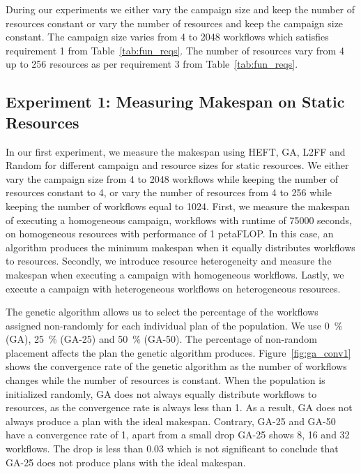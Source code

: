 During our experiments we either vary the campaign size and keep the number of resources constant or vary the number of resources and keep the campaign size constant.
The campaign size varies from 4 to 2048 workflows which satisfies requirement 1 from Table~\ref{tab:fun_reqs}.
The number of resources vary from 4 up to 256 resources as per requirement 3 from Table~\ref{tab:fun_reqs}.


\subsection{Experiment 1: Measuring Makespan on Static Resources}

In our first experiment, we measure the makespan using HEFT, GA, L2FF and Random for different campaign and resource sizes for static resources.
We either vary the campaign size from 4 to 2048 workflows while keeping the number of resources constant to 4, or vary the number of resources from 4 to 256 while keeping the number of workflows equal to 1024.
First, we measure the makespan of executing a homogeneous campaign, workflows with runtime of 75000 seconds, on homogeneous resources with performance of 1 petaFLOP.
In this case, an algorithm produces the minimum makespan when it equally distributes workflows to resources.
Secondly, we introduce resource heterogeneity and measure the makespan when executing a campaign with homogeneous workflows.
Lastly, we execute a campaign with heterogeneous workflows on heterogeneous resources.

The genetic algorithm allows us to select the percentage of the workflows assigned non-randomly for each individual plan of the population.
We use 0~\% (GA), 25~\% (GA-25) and 50~\% (GA-50).
The percentage of non-random placement affects the plan the genetic algorithm produces.
Figure~\ref{fig:ga_conv1} shows the convergence rate of the genetic algorithm as the number of workflows changes while the number of resources is constant.
When the population is initialized randomly, GA does not always equally distribute workflows to resources, as the convergence rate is always less than 1.
As a result, GA does not always produce a plan with the ideal makespan.
Contrary, GA-25 and GA-50 have a convergence rate of 1, apart from a small drop GA-25 shows 8, 16 and 32 workflows.
The drop is less than 0.03 which is not significant to conclude that GA-25 does not produce plans with the ideal makespan.


